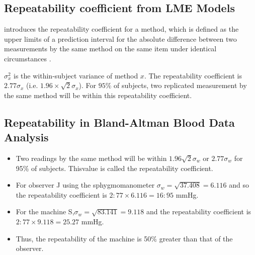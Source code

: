 \documentclass[12pt, a4paper]{article}
\begin{document}
	





\subsection{Repeatability coefficient from LME Models}
\citet{BA99} introduces the repeatability coefficient for a method, which is defined as the upper limits of a prediction interval for the absolute difference between two measurements by the same
method on the same item under identical circumstances \citep{BXC2008}.

$\sigma^2_{x}$ is the within-subject variance of method $x$. The repeatability coefficient is $2.77 \sigma_{x}$ (i.e. $1.96 \times \sqrt{2} \sigma_{x}$). For $95\%$ of subjects, two replicated measurement by the same method will be within this repeatability coefficient.




\subsection{Repeatability in Bland-Altman Blood Data Analysis}
\begin{itemize}
	\item Two readings by the same method will be within $1.96
	\sqrt{2} \sigma_w $ or $2.77 \sigma_w $ for 95\% of subjects. Thisvalue is called the repeatability coefficient.
	
	\item For observer J using the sphygmomanometer $ \sigma_w = \sqrt{37.408} = 6.116$ and so the repeatability coefficient is
	$2:77 \times 6.116 = 16:95$ mmHg.
	
	\item For the machine S,$ \sigma_w = \sqrt{83.141} = 9.118$ and the repeatability coefficient is $2:77 \times 9.118 = 25.27$ mmHg.
	
	\item Thus, the repeatability of the machine is 50\% greater than that of the observer.
\end{itemize}
\end{document}
